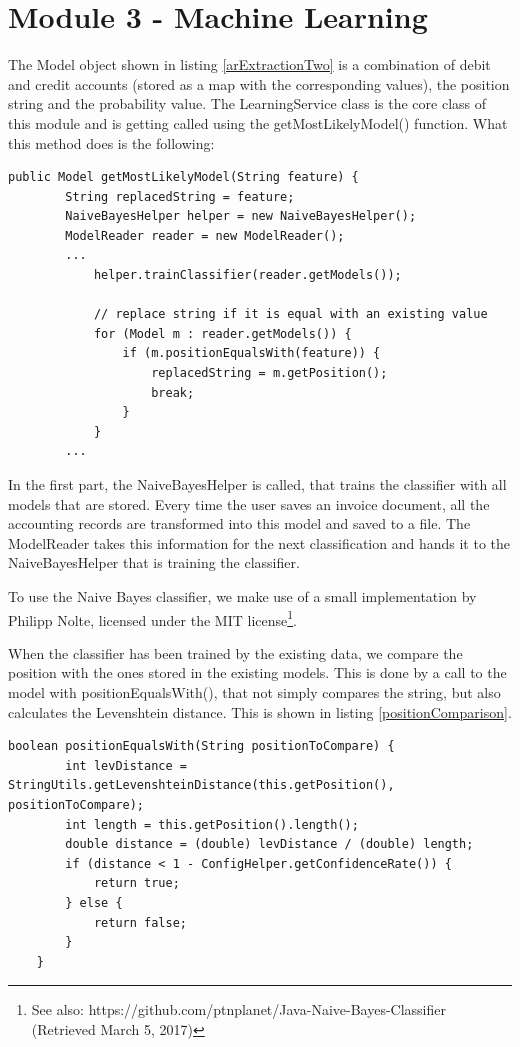 \section{Module 3 - Machine Learning}
\label{sec5.6}

The Model object shown in listing \ref{arExtractionTwo} is a combination of debit and credit accounts (stored as a map with the corresponding values), the position string and the probability value. The LearningService class is the core class of this module and is getting called using the getMostLikelyModel() function. What this method does is the following:

\begin{lstlisting}[caption={Search for the most likely model}]
 public Model getMostLikelyModel(String feature) {
        String replacedString = feature;
        NaiveBayesHelper helper = new NaiveBayesHelper();
        ModelReader reader = new ModelReader();
        ...
            helper.trainClassifier(reader.getModels());

            // replace string if it is equal with an existing value
            for (Model m : reader.getModels()) {
                if (m.positionEqualsWith(feature)) {
                    replacedString = m.getPosition();
                    break;
                }
            }
		...
\end{lstlisting}

In the first part, the NaiveBayesHelper is called, that trains the classifier with all models that are stored. Every time the user saves an invoice document, all the accounting records are transformed into this model and saved to a file. The ModelReader takes this information for the next classification and hands it to the NaiveBayesHelper that is training the classifier.

To use the Naive Bayes classifier, we make use of a small implementation by Philipp Nolte, licensed under the MIT license\footnote{See also: https://github.com/ptnplanet/Java-Naive-Bayes-Classifier (Retrieved March 5, 2017)}.

When the classifier has been trained by the existing data, we compare the position with the ones stored in the existing models. This is done by a call to the model with positionEqualsWith(), that not simply compares the string, but also calculates the Levenshtein distance. This is shown in listing \ref{positionComparison}.

\begin{lstlisting}[caption={Comparison between positions},label={positionComparison}]
    boolean positionEqualsWith(String positionToCompare) {
        int levDistance = StringUtils.getLevenshteinDistance(this.getPosition(), positionToCompare);
        int length = this.getPosition().length();
        double distance = (double) levDistance / (double) length;
        if (distance < 1 - ConfigHelper.getConfidenceRate()) {
            return true;
        } else {
            return false;
        }
    }
\end{lstlisting}

